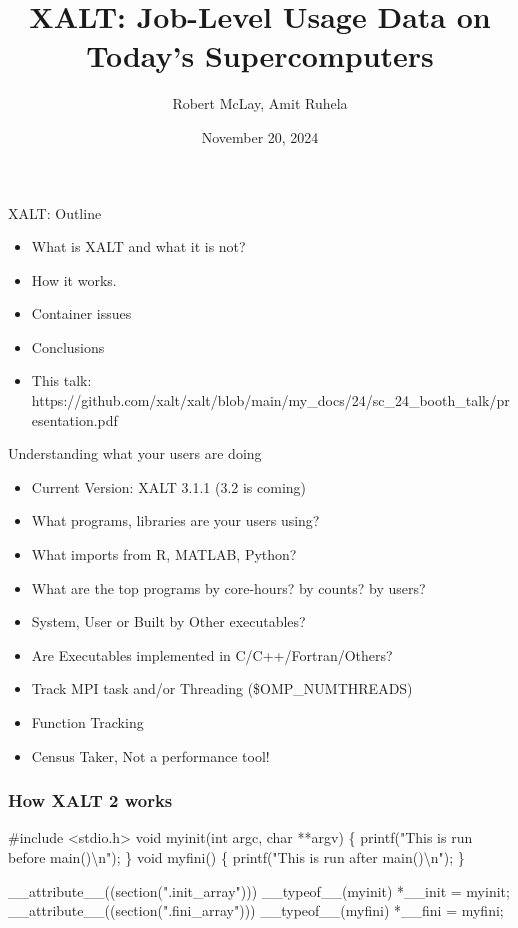 \documentclass{beamer}
\begin{document}
\title[XALT]{XALT: Job-Level Usage Data on Today's Supercomputers}
\author{Robert McLay, Amit Ruhela}
\date{November 20, 2024}

\frame{\titlepage}

\begin{frame}{XALT: Outline}
  \begin{itemize}
    \item What is XALT and what it is not?
    \item How it works.
    \item Container issues
    \item Conclusions
    \item This talk: https://github.com/xalt/xalt/blob/main/my\_docs/24/sc\_24\_booth\_talk/presentation.pdf
  \end{itemize}
\end{frame}

\begin{frame}{Understanding what your users are doing}
  \begin{itemize}
    \item Current Version: XALT 3.1.1 (3.2 is coming)
    \item What programs, libraries are your users using?
    \item What imports from R, MATLAB, Python?
    \item What are the top programs by core-hours? by counts? by users?
    \item System, User or Built by Other executables?
    \item Are Executables implemented in C/C++/Fortran/Others?
    \item Track MPI task and/or Threading (\$OMP\_NUMTHREADS)
    \item Function Tracking
    \item Census Taker, Not a performance tool!
  \end{itemize}
\end{frame}

\begin{frame}[fragile]
    \frametitle{How XALT 2 works}
 {\tiny
    \begin{semiverbatim}
#include <stdio.h>
void myinit(int argc, char **argv)
\{ printf("This is run before main()\textbackslash{}n"); \}
void myfini()
\{ printf("This is run after main()\textbackslash{}n"); \}

__attribute__((section(".init_array"))) __typeof__(myinit) *__init = myinit;
__attribute__((section(".fini_array"))) __typeof__(myfini) *__fini = myfini;
    \end{semiverbatim}
}
\end{frame}
\end{document}
